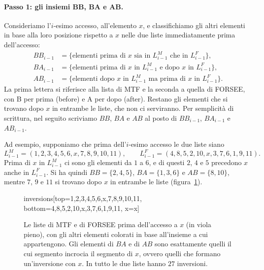 \paragraph{Passo 1: gli insiemi BB, BA e AB.}
Consideriamo l'$i$-esimo accesso, all'elemento $x$, e classifichiamo gli altri elementi in base alla loro posizione rispetto a $x$ nelle due liste immediatamente prima dell'accesso:
\begin{align*}
BB_{i-1} &= \{\text{elementi prima di } x \text{ sia in } L^M_{i-1} \text{ che in } L^F_{i-1}\}, \\
BA_{i-1} &= \{\text{elementi prima di } x \text{ in } L^M_{i-1} \text{ e dopo } x \text{ in } L^F_{i-1}\}, \\
AB_{i-1} &= \{\text{elementi dopo } x \text{ in } L^M_{i-1} \text{ ma prima di } x \text{ in } L^F_{i-1}\}.
\end{align*}
La prima lettera si riferisce alla lista di MTF e la seconda a quella di FORSEE, con B per prima (before) e A per dopo (after). Restano gli elementi che si trovano dopo $x$ in entrambe le liste, che non ci serviranno. Per semplicità di scrittura, nel seguito scriviamo $BB$, $BA$ e $AB$ al posto di $BB_{i-1}$, $BA_{i-1}$ e $AB_{i-1}$.

Ad esempio, supponiamo che prima dell'$i$-esimo accesso le due liste siano
\[
L^M_{i-1} = (1, 2, 3, 4, 5, 6, x, 7, 8, 9, 10, 11), \qquad L^F_{i-1} = (4, 8, 5, 2, 10, x, 3, 7, 6, 1, 9, 11).
\]
Prima di $x$ in $L^M_{i-1}$ ci sono gli elementi da $1$ a $6$, e di questi $2$, $4$ e $5$ precedono $x$ anche in $L^F_{i-1}$. Si ha quindi $BB = \{2, 4, 5\}$, $BA = \{1, 3, 6\}$ e $AB = \{8, 10\}$, mentre $7$, $9$ e $11$ si trovano dopo $x$ in entrambe le liste (figura~\ref{fig:mtf-insiemi}).

\begin{figure}[htbp]
\centering
\begin{widget}{inversions}[top={1,2,3,4,5,6,x,7,8,9,10,11}, bottom={4,8,5,2,10,x,3,7,6,1,9,11}, x=x]
\end{widget}
\caption{Le liste di MTF e di FORSEE prima dell'accesso a $x$ (in viola pieno), con gli altri elementi colorati in base all'insieme a cui appartengono. Gli elementi di $BA$ e di $AB$ sono esattamente quelli il cui segmento incrocia il segmento di $x$, ovvero quelli che formano un'inversione con $x$. In tutto le due liste hanno $27$ inversioni.}
\label{fig:mtf-insiemi}
\end{figure}

